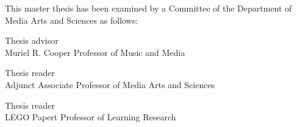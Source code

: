 %

\begin{titlepage}
\begin{large}
This master thesis has been examined by a Committee of the Department
of Media Arts and Sciences as follows:

\signature{Professor Tod Machover}{Thesis advisor \\
   Muriel R. Cooper Professor of Music and Media}

\signature{Professor Zach Lieberman}{Thesis reader \\
   Adjunct Associate Professor of Media Arts and Sciences}

\signature{Professor Mitchel Resnick}{Thesis reader \\
   LEGO Papert Professor of Learning Research}
\end{large}
\end{titlepage}
